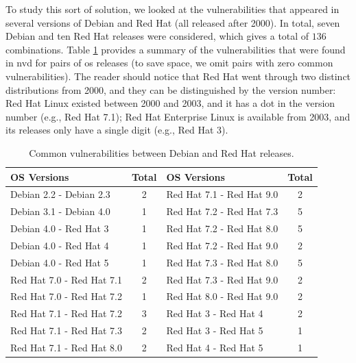 To study this sort of solution, we looked at the vulnerabilities that appeared in several versions of Debian and Red Hat (all released after 2000). 
In total, seven Debian and ten Red Hat releases were considered, which gives a total of $136$ combinations. 
Table \ref{tab:debian_RedHat} provides a summary of the vulnerabilities that were found in \gls{nvd} for pairs of \gls{os} releases (to save space, we omit pairs with zero common vulnerabilities). 
The reader should notice that Red Hat went through two distinct distributions from 2000, and they can be distinguished by the version number: Red Hat Linux existed between 2000 and 2003, and it has a dot in the version number (e.g., Red Hat 7.1); Red Hat Enterprise Linux is available from 2003, and its releases only have a single digit (e.g., Red Hat 3).

\begin{table}[!ht]
\begin{center}
{\scriptsize
\begin{tabular}{|l|c||l|c|}\hline
\textbf{OS Versions} & Total &  \textbf{OS Versions} & Total \\\hline\hline
Debian 2.2 - Debian 2.3 & 2 & Red Hat 7.1 - Red Hat 9.0 & 2  \\\hline
Debian 3.1 - Debian 4.0 & 1 & Red Hat 7.2 - Red Hat 7.3 & 5  \\\hline
Debian 4.0 - Red Hat 3 & 1 &  Red Hat 7.2 - Red Hat 8.0 & 5  \\\hline
Debian 4.0 - Red Hat 4 & 1 & Red Hat 7.2 - Red Hat 9.0 & 2  \\\hline
Debian 4.0 - Red Hat 5 & 1 & Red Hat 7.3 - Red Hat 8.0 & 5  \\\hline
Red Hat 7.0 - Red Hat 7.1 & 2 & Red Hat 7.3 - Red Hat 9.0 & 2  \\\hline
Red Hat 7.0 - Red Hat 7.2 & 1 & Red Hat 8.0 - Red Hat 9.0 & 2  \\\hline
Red Hat 7.1 - Red Hat 7.2 & 3 &  Red Hat 3 - Red Hat 4 & 2  \\\hline
Red Hat 7.1 - Red Hat 7.3 & 2 & Red Hat 3 - Red Hat 5 & 1  \\\hline
Red Hat 7.1 - Red Hat 8.0 & 2 &  Red Hat 4 - Red Hat 5 & 1  \\\hline
\end{tabular}
\caption{Common vulnerabilities between Debian and Red Hat releases.}
\label{tab:debian_RedHat}
}
\end{center}
\end{table}

